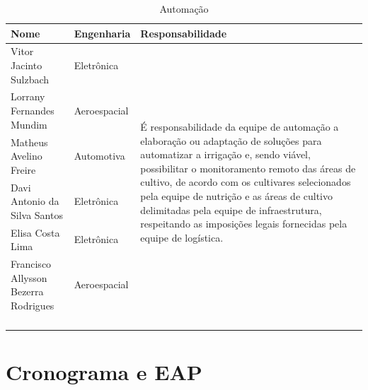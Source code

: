 \begin{anexosenv}
  \begin{table}[!htb]
    \centering
    \begin{tabular}{p{7cm}p{}p{}}
      \toprule
        \textbf{Nome} & \textbf{Engenharia} & \textbf{Responsabilidade} \\
      \midrule
        Vitor Jacinto Sulzbach               & Eletr\^{o}nica  & \multirow{8}{6,5cm}{É responsabilidade da equipe de automação a elaboração
                                                                 ou adaptação de soluções para automatizar a irrigação e, sendo viável,
                                                                 possibilitar o monitoramento remoto das áreas de cultivo, de acordo com
                                                                 os cultivares selecionados pela equipe de nutrição e as áreas de cultivo
                                                                 delimitadas pela equipe de infraestrutura, respeitando as imposições
                                                                 legais fornecidas pela equipe de logística.} \\ \cmidrule(r){1-2}
        Lorrany Fernandes Mundim             & Aeroespacial    & \\ \cmidrule(r){1-2}
        Matheus Avelino Freire               & Automotiva      & \\ \cmidrule(r){1-2}
        Davi Antonio da Silva Santos         & Eletr\^{o}nica  & \\ \cmidrule(r){1-2}
        Elisa Costa Lima                     & Eletr\^{o}nica  & \\ \cmidrule(r){1-2}
        Francisco Allysson Bezerra Rodrigues & Aeroespacial    & \\ \\ \\ \\ \\
      \bottomrule
    \end{tabular}
    \caption{Automação}
  \end{table}

\chapter{Cronograma e EAP}


\end{anexosenv}
